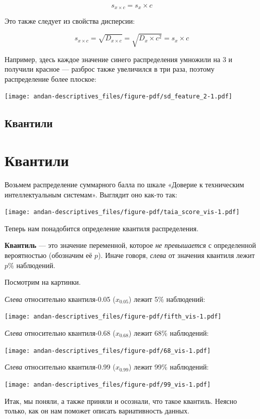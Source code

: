 \documentclass[
  letterpaper,
  DIV=11,
  numbers=noendperiod]{scrreprt}
\theoremstyle{definition}
\theoremstyle{remark}
\begin{document}
\[
s_{x \times c} = s_x \times c
\]

Это также следует из свойства дисперсии:

\[
s_{x \times c} = \sqrt{D_{x \times c}} = \sqrt{D_x \times c^2} = s_x \times c
\]

Например, здесь каждое значение синего распределения умножили на \(3\) и
получили красное --- разброс также увеличился в три раза, поэтому
распределение более плоское:

\texttt{[image: andan-descriptives\_files/figure-pdf/sd\_feature\_2-1.pdf]}

\subsection{Квантили}\label{andan-descriptives-quantiles}

\section{Квантили}\label{quantiles}

Возьмем распределение суммарного балла по шкале «Доверие к техническим
интеллектуальным системам». Выглядит оно как-то так:

\texttt{[image: andan-descriptives\_files/figure-pdf/taia\_score\_vis-1.pdf]}

Теперь нам понадобится определение квантиля распределения.

\textbf{Квантиль} --- это значение переменной, которое \emph{не
превышается} с определенной вероятностью (обозначим её \(p\)). Иначе
говоря, \emph{слева} от значения квантиля лежит \(p\%\) наблюдений.

Посмотрим на картинки.

\emph{Слева} относительно квантиля-0.05 (\(x_{0.05}\)) лежит 5\%
наблюдений:

\texttt{[image: andan-descriptives\_files/figure-pdf/fifth\_vis-1.pdf]}

\emph{Слева} относительно квантиля-0.68 (\(x_{0.68}\)) лежит 68\%
наблюдений:

\texttt{[image: andan-descriptives\_files/figure-pdf/68\_vis-1.pdf]}

\emph{Слева} относительно квантиля-0.99 (\(x_{0.99}\)) лежит 99\%
наблюдений:

\texttt{[image: andan-descriptives\_files/figure-pdf/99\_vis-1.pdf]}

Итак, мы поняли, а также приняли и осознали, что такое квантиль. Неясно
только, как он нам поможет описать вариативность данных.
\end{document}
